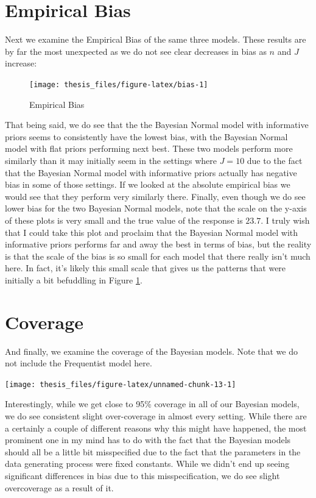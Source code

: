 \documentclass[12pt,twoside]{reedthesis}
\begin{document}
\hypertarget{empirical-bias}{%
\section{Empirical Bias}\label{empirical-bias}}

Next we examine the Empirical Bias of the same three models. These results are by far the most unexpected as we do not see clear decreases in bias as \(n\) and \(J\) increase:
\begin{figure}

{\centering \texttt{[image: thesis\_files/figure-latex/bias-1]} 

}

\caption{Empirical Bias}\label{fig:bias}
\end{figure}
That being said, we do see that the the Bayesian Normal model with informative priors seems to consistently have the lowest bias, with the Bayesian Normal model with flat priors performing next best. These two models perform more similarly than it may initially seem in the settings where \(J = 10\) due to the fact that the Bayesian Normal model with informative priors actually has negative bias in some of those settings. If we looked at the absolute empirical bias we would see that they perform very similarly there. Finally, even though we do see lower bias for the two Bayesian Normal models, note that the scale on the y-axis of these plots is very small and the true value of the response is \(23.7\). I truly wish that I could take this plot and proclaim that the Bayesian Normal model with informative priors performs far and away the best in terms of bias, but the reality is that the scale of the bias is so small for each model that there really isn't much here. In fact, it's likely this small scale that gives us the patterns that were initially a bit befuddling in Figure \ref{fig:bias}.

\hypertarget{coverage}{%
\section{Coverage}\label{coverage}}

And finally, we examine the coverage of the Bayesian models. Note that we do not include the Frequentist model here.
\begin{center}\texttt{[image: thesis\_files/figure-latex/unnamed-chunk-13-1]} \end{center}

Interestingly, while we get close to 95\% coverage in all of our Bayesian models, we do see consistent slight over-coverage in almost every setting. While there are a certainly a couple of different reasons why this might have happened, the most prominent one in my mind has to do with the fact that the Bayesian models should all be a little bit misspecified due to the fact that the parameters in the data generating process were fixed constants. While we didn't end up seeing significant differences in bias due to this misspecification, we do see slight overcoverage as a result of it.
\end{document}
